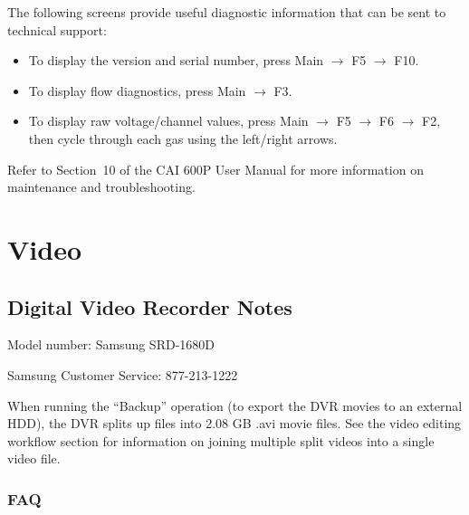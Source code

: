 \documentclass[11pt,oneside]{book}
\begin{document}
The following screens provide useful diagnostic information that can be sent to technical support:
\begin{itemize}
\item To display the version and serial number, press Main $\rightarrow$ F5 $\rightarrow$ F10.
\item To display flow diagnostics, press Main $\rightarrow$ F3.
\item To display raw voltage/channel values, press Main $\rightarrow$ F5 $\rightarrow$ F6 $\rightarrow$ F2, then cycle through each gas using the left/right arrows.
\end{itemize}

Refer to Section~10 of the CAI 600P User Manual for more information on maintenance and troubleshooting.


\chapter{Video}
\label{chap:Video}

\section{Digital Video Recorder Notes}

Model number: Samsung SRD-1680D

Samsung Customer Service: 877-213-1222

When running the ``Backup'' operation (to export the DVR movies to an external HDD), the DVR splits up files into 2.08 GB .avi movie files. See the video editing workflow section for information on joining multiple split videos into a single video file.

\subsection*{FAQ}
\end{document}
